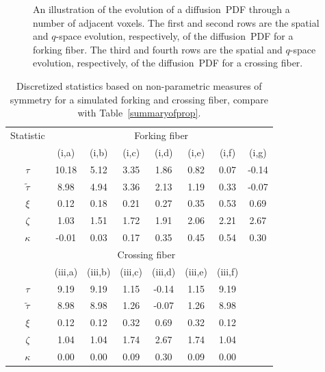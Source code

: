 \documentclass[dvips,aoas,preprint]{imsart}
\numberwithin{equation}{section}
\theoremstyle{plain}
\begin{document}
\begin{figure}[!htbp]
\begin{minipage}[]{0.12\textwidth}
    \end{minipage}
  \caption{An illustration of the evolution of a diffusion~PDF through
    a number of adjacent voxels.  The first and second rows are the
    spatial and $q$-space evolution, respectively, of the
    diffusion~PDF for a forking fiber.  The third and fourth rows are
    the spatial and $q$-space evolution, respectively, of the
    diffusion~PDF for a crossing fiber.}
  \label{fig:evolution}
\end{figure}

\begin{table}[!htbp]
  \caption{Discretized statistics based on non-parametric measures of
    symmetry for a simulated forking and crossing fiber, compare with
    Table~\ref{summaryofprop}.}
  \label{raw_properties}
  \begin{tabular}{cccccccc}
    \hline
Statistic        & \multicolumn{7}{c}{Forking fiber}\\
\cline{2-8}
                 & (i,a) & (i,b) & (i,c) & (i,d) & (i,e) & (i,f) & (i,g)\\
\hline
$\tau$           & 10.18  & 5.12 & 3.35 & 1.86 & 0.82 & 0.07 & -0.14\\
$\tilde{\tau}$   & 8.98  & 4.94 & 3.36 & 2.13 & 1.19 & 0.33 & -0.07\\
$\xi$            & 0.12  & 0.18 & 0.21 & 0.27 & 0.35 & 0.53  & 0.69\\
$\zeta$          & 1.03  & 1.51 & 1.72 & 1.91 & 2.06 & 2.21  & 2.67\\
$\kappa$         & -0.01 & 0.03 & 0.17 & 0.35 & 0.45 & 0.54  & 0.30\\
\hline
                 & \multicolumn{6}{c}{Crossing fiber}\\
\cline{2-8}
                 & (iii,a) & (iii,b) & (iii,c) & (iii,d) & (iii,e) & (iii,f)\\
\hline
$\tau$           & 9.19 & 9.19 & 1.15 & -0.14 & 1.15 & 9.19\\
$\tilde\tau$     & 8.98 & 8.98 & 1.26 & -0.07 & 1.26 & 8.98\\
$\xi$            & 0.12 & 0.12 & 0.32 &  0.69 & 0.32 & 0.12\\
$\zeta$          & 1.04 & 1.04 & 1.74 &  2.67 & 1.74 & 1.04\\
$\kappa$         & 0.00 & 0.00 & 0.09 &  0.30 & 0.09 & 0.00\\
\hline
  \end{tabular}
\end{table}
\end{document}
